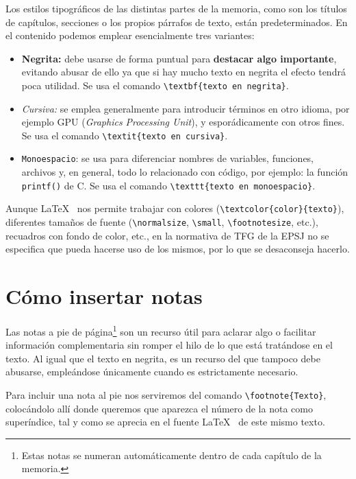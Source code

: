 Los estilos tipográficos de las distintas partes de la memoria, como son los títulos de capítulos, secciones o los propios párrafos de texto, están predeterminados. En el contenido podemos emplear esencialmente tres variantes:

\begin{itemize}
    \item \textbf{Negrita:} debe usarse de forma puntual para \textbf{destacar algo importante}, evitando abusar de ello ya que si hay mucho texto en negrita el efecto tendrá poca utilidad. Se usa el comando \verb|\textbf{texto en negrita}|.
    
    \item \textit{Cursiva:} se emplea generalmente para introducir términos en otro idioma, por ejemplo GPU (\textit{Graphics Processing Unit}), y esporádicamente con otros fines. Se usa el comando \verb|\textit{texto en cursiva}|.
    
    \item \texttt{Monoespacio}: se usa para diferenciar nombres de variables, funciones, archivos y, en general, todo lo relacionado con código, por ejemplo: la función \texttt{printf()} de C. Se usa el comando \verb|\texttt{texto en monoespacio}|.
\end{itemize}

Aunque \LaTeX~ nos permite trabajar con colores (\verb|\textcolor{color}{texto}|), diferentes tamaños de fuente (\verb|\normalsize|, \verb|\small|, \verb|\footnotesize|, etc.), recuadros con fondo de color, etc., en la normativa de TFG de la EPSJ no se especifica que pueda hacerse uso de los mismos, por lo que se desaconseja hacerlo.

\section{Cómo insertar notas}

Las notas a pie de página\footnote{Estas notas se numeran automáticamente dentro de cada capítulo de la memoria.} son un recurso útil para aclarar algo o facilitar información complementaria sin romper el hilo de lo que está tratándose en el texto. Al igual que el texto en negrita, es un recurso del que tampoco debe abusarse, empleándose únicamente cuando es estrictamente necesario.

Para incluir una nota al pie nos serviremos del comando \verb|\footnote{Texto}|, colocándolo allí donde queremos que aparezca el número de la nota como superíndice, tal y como se aprecia en el fuente \LaTeX~ de este mismo texto.

